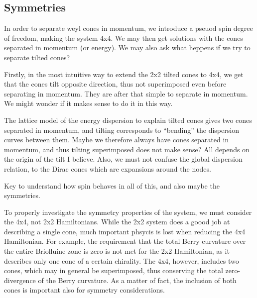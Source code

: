 \subsection{Symmetries}
In order to separate weyl cones in momentum, we introduce a pseuod spin degree of freedom, making the system 4x4.
We may then get solutions with the cones separated in momentum (or energy).
We may also ask what heppens if we try to separate tilted cones?

Firstly, in the most intuitive way to extend the 2x2 tilted cones to 4x4, we get that the cones tilt opposite direction, thus not superimposed even before separating in momentum.
They are after that simple to separate in momentum.
We might wonder if it makes sense to do it in this way.

The lattice model of the energy dispersion to explain tilted cones gives two cones separated in momentum, and tilting corresponds to ``bending'' the dispersion curves between them.
Maybe we therefore always have cones separated in momentum, and thus tilting superimposed does not make sense?
All depends on the origin of the tilt I believe.
Also, we must not confuse the global dispersion relation, to the Dirac cones which are expansions around the nodes.

Key to understand how spin behaves in all of this, and also maybe the symmetries.

To properly investigate the symmetry properties of the system, we must consider the 4x4, not 2x2 Hamiltonians.
While the 2x2 system does a goood job at describing a single cone, much important phsycis is lost when reducing the 4x4 Hamiltonian.
For example, the requirement that the total Berry curvature over the entire Briolluine zone is zero is not met for the 2x2 Hamiltonian, as it describes only one cone of a certain chirality.
The 4x4, however, includes two cones, which may in general be superimposed, thus conserving the total zero-divergence of the Berry curvature.
As a matter of fact, the inclusion of both cones is important also for symmetry considerations.

